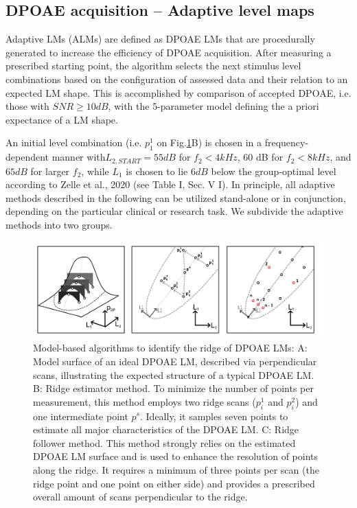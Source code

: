 \documentclass[journal,twoside,web]{ieeecolor2}
\begin{document}
\subsection{DPOAE acquisition – Adaptive level maps}
Adaptive LMs (ALMs) are defined as DPOAE LMs that are procedurally generated to increase the efficiency of DPOAE acquisition. After measuring a prescribed starting point, the algorithm selects the next stimulus level combinations based on the configuration of assessed data and their relation to an expected LM shape.    This is accomplished by comparison of accepted DPOAE, i.e. those with $SNR \ge 10 dB$, with the 5-parameter model defining the a priori expectance of a LM shape.

An initial level combination (i.e. $p_1^1$ on Fig.\ref{fig_AMB}B) is chosen in a frequency-dependent manner with$L_{2,START} = 55 dB$ for $f_2 < 4 kHz$, 60 dB for $f_2 < 8 kHz$, and $65 dB$ for larger $f_2$, while $L_1$ is chosen to lie $6 dB$ below the group-optimal level according to Zelle et al., 2020 (see Table I, Sec. V  I).  In principle, all adaptive methods described in the following can be utilized stand-alone or in conjunction, depending on the particular clinical or research task. We subdivide the adaptive methods into two groups.

\begin{figure}
\includegraphics[width=\textwidth]{Fig_ALM_ModelBased} %
\caption{Model-based algorithms to identify the ridge of DPOAE LMs: A: Model surface of an ideal DPOAE LM, described via perpendicular scans, illustrating the expected structure of a typical DPOAE LM. B: Ridge estimator method. To minimize the number of points per measurement, this method employs two ridge scans ($p^1_i$ and $p^2_i$) and one intermediate point $p^s$. Ideally, it samples seven points to estimate all major characteristics of the DPOAE LM. C: Ridge follower method. This method strongly relies on the estimated DPOAE LM surface and is used to enhance the resolution of points along the ridge. It requires a minimum of three points per scan (the ridge point and one point on either side) and provides a prescribed overall amount of scans perpendicular to the ridge.}
\label{fig_AMB}
\end{figure}
\end{document}
